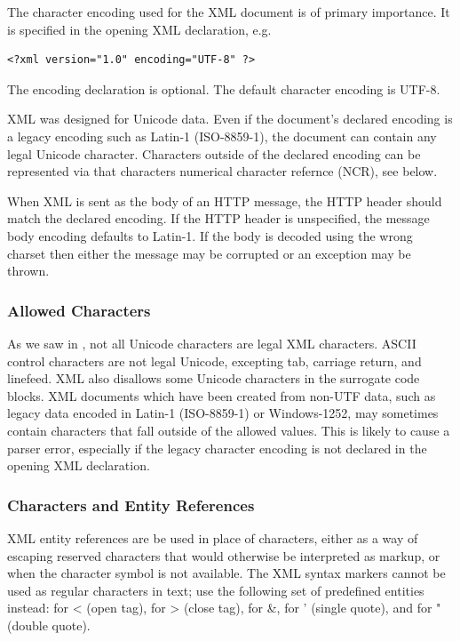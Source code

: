 The character encoding used for the XML document is of primary importance.
It is specified in the opening XML declaration, e.g.
\begin{verbatim} 
<?xml version="1.0" encoding="UTF-8" ?>
\end{verbatim}  
The encoding declaration is optional.
The default character encoding is UTF-8.

XML was designed for Unicode data.
Even if the document's declared encoding is a 
legacy encoding such as Latin-1 (ISO-8859-1),
the document can contain any legal Unicode character.
Characters outside of the declared encoding can be represented 
via that characters numerical character refernce (NCR), see below.

When XML is sent as the body of an HTTP message, the HTTP  
header should match the declared encoding.  If the HTTP  header
is unspecified, the message body encoding defaults to Latin-1.
If the body is decoded using the wrong charset then either the message may be
corrupted or an exception may be thrown.


\subsubsection{Allowed Characters}

As we saw in , not all Unicode characters are legal XML characters.
ASCII control characters are not legal Unicode, excepting tab, carriage return, and linefeed.
XML also disallows some Unicode characters in the surrogate code blocks.
XML documents which have been created from non-UTF data, such as legacy data
encoded in Latin-1 (ISO-8859-1) or Windows-1252, 
may sometimes contain characters that fall outside of the allowed values.
This is likely to cause a parser error, especially if the legacy character encoding
is not declared in the opening XML declaration.


\subsubsection{Characters and Entity References}\label{section:xml-entity-refs}

XML entity references are be used in place of characters, either as a way of
escaping reserved characters that would otherwise be interpreted as markup,
or when the character symbol is not available.
The XML syntax markers cannot be used as regular characters in text; 
use the following set of predefined entities instead:
 for < (open tag),  for > (close tag),  for \&,
 for ' (single quote), and  for " (double quote).


